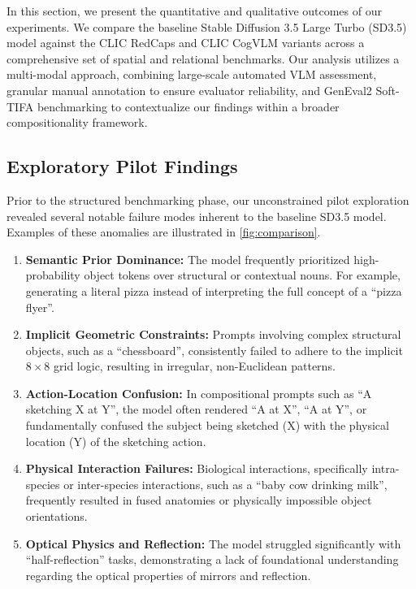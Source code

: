 In this section, we present the quantitative and qualitative outcomes of our experiments. We compare the baseline Stable Diffusion 3.5 Large Turbo (SD3.5) model against the CLIC RedCaps and CLIC CogVLM variants across a comprehensive set of spatial and relational benchmarks. Our analysis utilizes a multi-modal approach, combining large-scale automated VLM assessment, granular manual annotation to ensure evaluator reliability, and GenEval2 Soft-TIFA benchmarking to contextualize our findings within a broader compositionality framework. 

\subsection{Exploratory Pilot Findings}
Prior to the structured benchmarking phase, our unconstrained pilot exploration revealed several notable failure modes inherent to the baseline SD3.5 model. Examples of these anomalies are illustrated in \cref{fig:comparison}.

\begin{enumerate}
    \item \textbf{Semantic Prior Dominance:} The model frequently prioritized high-probability object tokens over structural or contextual nouns. For example, generating a literal pizza instead of interpreting the full concept of a ``pizza flyer''.
    \item \textbf{Implicit Geometric Constraints:} Prompts involving complex structural objects, such as a ``chessboard'', consistently failed to adhere to the implicit $8 \times 8$ grid logic, resulting in irregular, non-Euclidean patterns.
    \item \textbf{Action-Location Confusion:} In compositional prompts such as ``A sketching X at Y'', the model often rendered ``A at X'', ``A at Y'', or fundamentally confused the subject being sketched (X) with the physical location (Y) of the sketching action.
    \item \textbf{Physical Interaction Failures:} Biological interactions, specifically intra-species or inter-species interactions, such as a ``baby cow drinking milk'', frequently resulted in fused anatomies or physically impossible object orientations.
    \item \textbf{Optical Physics and Reflection:} The model struggled significantly with ``half-reflection'' tasks, demonstrating a lack of foundational understanding regarding the optical properties of mirrors and reflection.
\end{enumerate}

